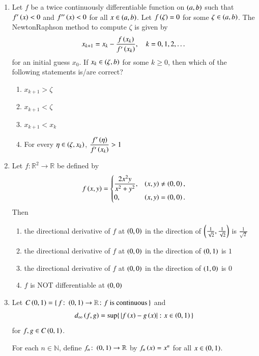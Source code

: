 \documentclass[journal,12pt,onecolumn]{IEEEtran}
\theoremstyle{remark}
\begin{document}
\begin{enumerate}[start=1, label=Q.\arabic*]
\hfill{}


\item Let $f$ be a twice continuously differentiable function on $\left(a,b\right)$ such that $f'\left(x\right)<0$ and $f''\left(x\right)<0$ for all $x\in \left(a,b\right)$. Let $f\left(\zeta\right)=0$ for some $\zeta\in \left(a,b\right)$. The Newton\brak{-}Raphson method to compute $\zeta$ is given by
\[
x_{k+1}=x_{k}-\frac{f\left(x_{k}\right)}{f'\left(x_{k}\right)},\quad k=0,1,2,\dots
\]
for an initial guess $x_{0}$. If $x_{k}\in \left(\zeta,b\right)$ for some $k\ge 0$, then which of the following statements is/are correct?
\begin{enumerate}
\item $x_{k+1}>\zeta$
\item $x_{k+1}<\zeta$
\item $x_{k+1}<x_{k}$
\item For every $\eta\in \left(\zeta,x_{k}\right)$, $\dfrac{f'\left(\eta\right)}{f'\left(x_{k}\right)}>1$
\end{enumerate}

\hfill{}

\item Let $f \colon \mathbb{R}^{2} \to \mathbb{R}$ be defined by
\[
f\left(x,y\right)=
\begin{cases}
\dfrac{2x^{2}y}{x^{2}+y^{2}}, & \left(x,y\right)\ne \left(0,0\right),\\[4pt]
0, & \left(x,y\right)=\left(0,0\right).
\end{cases}
\]
Then
\begin{enumerate}
\item the directional derivative of $f$ at $\left(0,0\right)$ in the direction of $\left(\tfrac{1}{\sqrt{2}},\tfrac{1}{\sqrt{2}}\right)$ is $\tfrac{1}{\sqrt{2}}$
\item the directional derivative of $f$ at $\left(0,0\right)$ in the direction of $\left(0,1\right)$ is $1$
\item the directional derivative of $f$ at $\left(0,0\right)$ in the direction of $\left(1,0\right)$ is $0$
\item $f$ is NOT differentiable at $\left(0,0\right)$
\end{enumerate}

\hfill{}


\item Let $C\left(0,1\right)=\{\, f \colon \left(0,1\right)\to \mathbb{R} \colon f \text{ is continuous} \,\}$ and
\[
d_{\infty}\left(f,g\right)=\sup\{\, \left\vert f\left(x\right)-g\left(x\right)\right\vert \colon x\in \left(0,1\right) \,\}
\]
for $f,g\in C\left(0,1\right)$.  

For each $n\in \mathbb{N}$, define $f_{n}\colon \left(0,1\right)\to \mathbb{R}$ by $f_{n}\left(x\right)=x^{n}$ for all $x\in \left(0,1\right)$.  


\end{enumerate}
\end{document}
